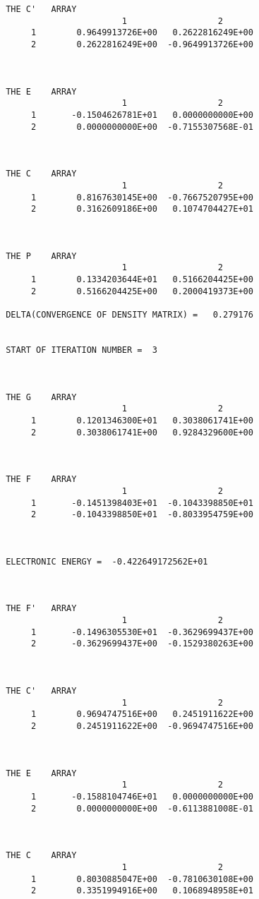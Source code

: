 \begin{verbatim}
 THE C'   ARRAY
                        1                  2
      1        0.9649913726E+00   0.2622816249E+00
      2        0.2622816249E+00  -0.9649913726E+00



 THE E    ARRAY
                        1                  2
      1       -0.1504626781E+01   0.0000000000E+00
      2        0.0000000000E+00  -0.7155307568E-01



 THE C    ARRAY
                        1                  2
      1        0.8167630145E+00  -0.7667520795E+00
      2        0.3162609186E+00   0.1074704427E+01



 THE P    ARRAY
                        1                  2
      1        0.1334203644E+01   0.5166204425E+00
      2        0.5166204425E+00   0.2000419373E+00

 DELTA(CONVERGENCE OF DENSITY MATRIX) =   0.279176


 START OF ITERATION NUMBER =  3



 THE G    ARRAY
                        1                  2
      1        0.1201346300E+01   0.3038061741E+00
      2        0.3038061741E+00   0.9284329600E+00



 THE F    ARRAY
                        1                  2
      1       -0.1451398403E+01  -0.1043398850E+01
      2       -0.1043398850E+01  -0.8033954759E+00



 ELECTRONIC ENERGY =  -0.422649172562E+01



 THE F'   ARRAY
                        1                  2
      1       -0.1496305530E+01  -0.3629699437E+00
      2       -0.3629699437E+00  -0.1529380263E+00



 THE C'   ARRAY
                        1                  2
      1        0.9694747516E+00   0.2451911622E+00
      2        0.2451911622E+00  -0.9694747516E+00



 THE E    ARRAY
                        1                  2
      1       -0.1588104746E+01   0.0000000000E+00
      2        0.0000000000E+00  -0.6113881008E-01



 THE C    ARRAY
                        1                  2
      1        0.8030885047E+00  -0.7810630108E+00
      2        0.3351994916E+00   0.1068948958E+01




\end{verbatim}
